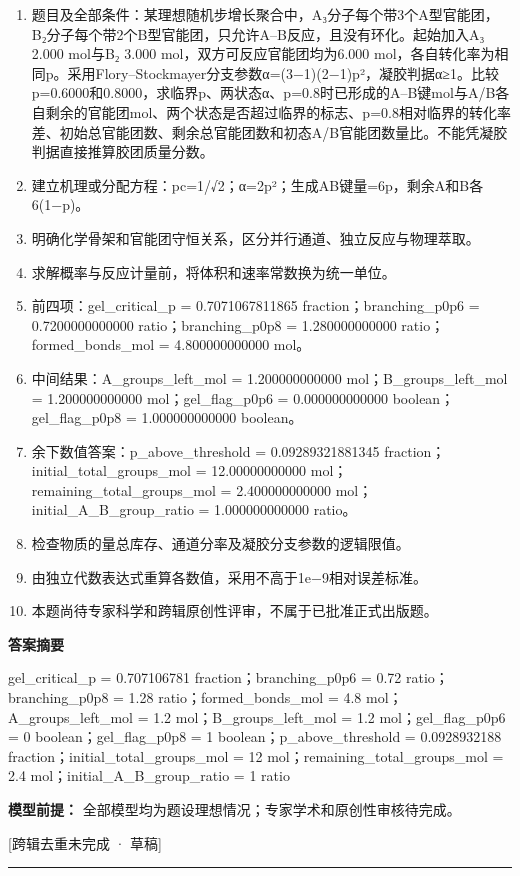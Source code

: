 \documentclass[UTF8,11pt,a4paper]{ctexart}
\begin{document}
\begin{enumerate}
\item 题目及全部条件：某理想随机步增长聚合中，A₃分子每个带3个A型官能团，B₂分子每个带2个B型官能团，只允许A–B反应，且没有环化。起始加入A₃ 2.000 mol与B₂ 3.000 mol，双方可反应官能团均为6.000 mol，各自转化率为相同p。采用Flory–Stockmayer分支参数α=(3−1)(2−1)p²，凝胶判据α≥1。比较p=0.6000和0.8000，求临界p、两状态α、p=0.8时已形成的A–B键mol与A/B各自剩余的官能团mol、两个状态是否超过临界的标志、p=0.8相对临界的转化率差、初始总官能团数、剩余总官能团数和初态A/B官能团数量比。不能凭凝胶判据直接推算胶团质量分数。
\item 建立机理或分配方程：pc=1/√2；α=2p²；生成AB键量=6p，剩余A和B各6(1−p)。
\item 明确化学骨架和官能团守恒关系，区分并行通道、独立反应与物理萃取。
\item 求解概率与反应计量前，将体积和速率常数换为统一单位。
\item 前四项：gel\_critical\_p = 0.7071067811865 fraction；branching\_p0p6 = 0.7200000000000 ratio；branching\_p0p8 = 1.280000000000 ratio；formed\_bonds\_mol = 4.800000000000 mol。
\item 中间结果：A\_groups\_left\_mol = 1.200000000000 mol；B\_groups\_left\_mol = 1.200000000000 mol；gel\_flag\_p0p6 = 0.000000000000 boolean；gel\_flag\_p0p8 = 1.000000000000 boolean。
\item 余下数值答案：p\_above\_threshold = 0.09289321881345 fraction；initial\_total\_groups\_mol = 12.00000000000 mol；remaining\_total\_groups\_mol = 2.400000000000 mol；initial\_A\_B\_group\_ratio = 1.000000000000 ratio。
\item 检查物质的量总库存、通道分率及凝胶分支参数的逻辑限值。
\item 由独立代数表达式重算各数值，采用不高于1e−9相对误差标准。
\item 本题尚待专家科学和跨辑原创性评审，不属于已批准正式出版题。
\end{enumerate}
\noindent\textbf{答案摘要}\par
gel\_critical\_p = 0.707106781 fraction；branching\_p0p6 = 0.72 ratio；branching\_p0p8 = 1.28 ratio；formed\_bonds\_mol = 4.8 mol；A\_groups\_left\_mol = 1.2 mol；B\_groups\_left\_mol = 1.2 mol；gel\_flag\_p0p6 = 0 boolean；gel\_flag\_p0p8 = 1 boolean；p\_above\_threshold = 0.0928932188 fraction；initial\_total\_groups\_mol = 12 mol；remaining\_total\_groups\_mol = 2.4 mol；initial\_A\_B\_group\_ratio = 1 ratio\par
\noindent\textbf{模型前提：}
全部模型均为题设理想情况；专家学术和原创性审核待完成。\par
\noindent\textcolor{red!65!black}{[跨辑去重未完成 · 草稿]} \par
\medskip\hrule\medskip
{}
\end{document}
